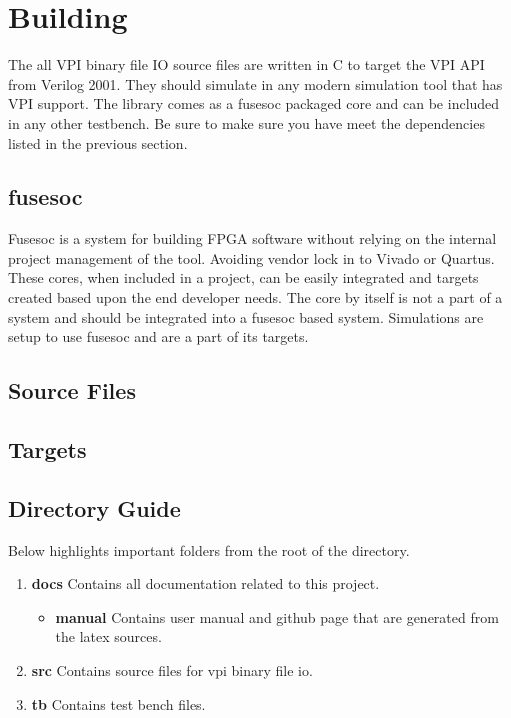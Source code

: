 \section{Building}

\par
The all VPI binary file IO source files are written in C to target the VPI API from Verilog 2001. They should simulate in any modern simulation tool that has VPI support.
The library comes as a fusesoc packaged core and can be included in any other testbench. Be sure to make sure you have meet the dependencies listed in the previous section.

\subsection{fusesoc}
\par
Fusesoc is a system for building FPGA software without relying on the internal project management of the tool. Avoiding vendor lock in to Vivado or Quartus.
These cores, when included in a project, can be easily integrated and targets created based upon the end developer needs. The core by itself is not a part of
a system and should be integrated into a fusesoc based system. Simulations are setup to use fusesoc and are a part of its targets.

\subsection{Source Files}



\subsection{Targets} \label{targets}



\subsection{Directory Guide}

\par
Below highlights important folders from the root of the directory.

\begin{enumerate}
  \item \textbf{docs} Contains all documentation related to this project.
    \begin{itemize}
      \item \textbf{manual} Contains user manual and github page that are generated from the latex sources.
    \end{itemize}
  \item \textbf{src} Contains source files for vpi binary file io.
  \item \textbf{tb} Contains test bench files.
\end{enumerate}

